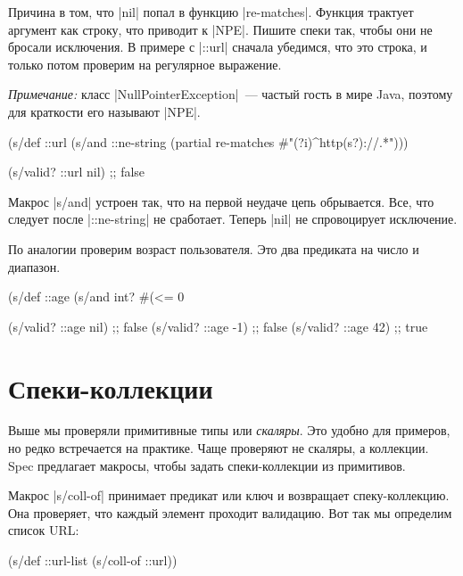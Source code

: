 Причина в том, что \spverb|nil| попал в функцию \spverb|re-matches|. Функция
трактует аргумент как строку, что приводит к \spverb|NPE|. Пишите спеки так,
чтобы они не бросали исключения. В примере с \spverb|::url| сначала убедимся,
что это строка, и только потом проверим на регулярное выражение.

\emph{Примечание:} класс \spverb|NullPointerException|~--- частый гость в мире
Java, поэтому для краткости его называют \spverb|NPE|.

\begin{english}
  \begin{clojure}
(s/def ::url
  (s/and ::ne-string
         (partial re-matches #"(?i)^http(s?)://.*")))

(s/valid? ::url nil) ;; false
  \end{clojure}
\end{english}

Макрос \spverb|s/and| устроен так, что на первой неудаче цепь обрывается. Все,
что следует после \spverb|::ne-string| не сработает. Теперь \spverb|nil| не
спровоцирует исключение.

По аналогии проверим возраст пользователя. Это два предиката на число и
диапазон.

\begin{english}
  \begin{clojure}
(s/def ::age
  (s/and int? #(<= 0 %

(s/valid? ::age nil) ;; false
(s/valid? ::age -1)  ;; false
(s/valid? ::age 42)  ;; true
  \end{clojure}
\end{english}

\section{Спеки-коллекции}

Выше мы проверяли примитивные типы или \emph{скаляры}. Это удобно для примеров,
но редко встречается на практике. Чаще проверяют не скаляры, а коллекции. Spec
предлагает макросы, чтобы задать спеки-коллекции из примитивов.

Макрос \spverb|s/coll-of| принимает предикат или ключ и возвращает
спеку-коллекцию. Она проверяет, что каждый элемент проходит валидацию. Вот так
мы определим список URL:

\begin{english}
  \begin{clojure}
(s/def ::url-list (s/coll-of ::url))
  \end{clojure}
\end{english}

